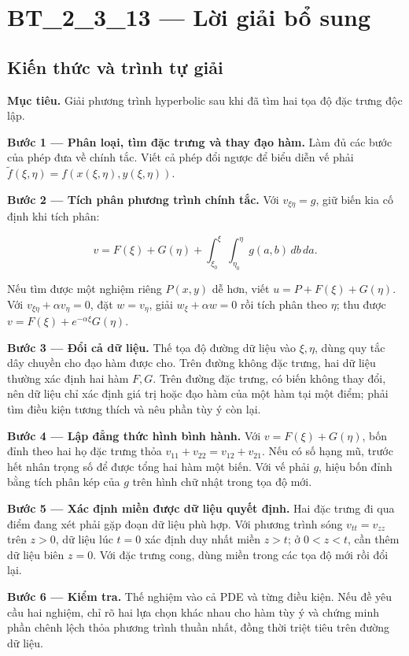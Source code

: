 \documentclass[10pt,a4paper]{article}
\begin{document}
\section*{BT\_2\_3\_13 — Lời giải bổ sung}
\subsection*{Kiến thức và trình tự giải}
\textbf{Mục tiêu.} Giải phương trình hyperbolic sau khi đã tìm hai tọa độ đặc trưng độc lập.

\textbf{Bước 1 — Phân loại, tìm đặc trưng và thay đạo hàm.} Làm đủ các bước của phép đưa về chính tắc. Viết cả phép đổi ngược để biểu diễn vế phải $\widetilde f(\xi,\eta)=f(x(\xi,\eta),y(\xi,\eta))$.

\textbf{Bước 2 — Tích phân phương trình chính tắc.} Với $v_{\xi\eta}=g$, giữ biến kia cố định khi tích phân:


\[
v=F(\xi)+G(\eta)+\int_{\xi_0}^{\xi}\int_{\eta_0}^{\eta}g(a,b)\,db\,da.
\]


Nếu tìm được một nghiệm riêng $P(x,y)$ dễ hơn, viết $u=P+F(\xi)+G(\eta)$. Với $v_{\xi\eta}+\alpha v_\eta=0$, đặt $w=v_\eta$, giải $w_\xi+\alpha w=0$ rồi tích phân theo $\eta$; thu được $v=F(\xi)+e^{-\alpha\xi}G(\eta)$.

\textbf{Bước 3 — Đổi cả dữ liệu.} Thế tọa độ đường dữ liệu vào $\xi,\eta$, dùng quy tắc dây chuyền cho đạo hàm được cho. Trên đường không đặc trưng, hai dữ liệu thường xác định hai hàm $F,G$. Trên đường đặc trưng, có biến không thay đổi, nên dữ liệu chỉ xác định giá trị hoặc đạo hàm của một hàm tại một điểm; phải tìm điều kiện tương thích và nêu phần tùy ý còn lại.

\textbf{Bước 4 — Lập đẳng thức hình bình hành.} Với $v=F(\xi)+G(\eta)$, bốn đỉnh theo hai họ đặc trưng thỏa $v_{11}+v_{22}=v_{12}+v_{21}$. Nếu có số hạng mũ, trước hết nhân trọng số để được tổng hai hàm một biến. Với vế phải $g$, hiệu bốn đỉnh bằng tích phân kép của $g$ trên hình chữ nhật trong tọa độ mới.

\textbf{Bước 5 — Xác định miền được dữ liệu quyết định.} Hai đặc trưng đi qua điểm đang xét phải gặp đoạn dữ liệu phù hợp. Với phương trình sóng $v_{tt}=v_{zz}$ trên $z>0$, dữ liệu lúc $t=0$ xác định duy nhất miền $z>t$; ở $0<z<t$, cần thêm dữ liệu biên $z=0$. Với đặc trưng cong, dùng miền trong các tọa độ mới rồi đổi lại.

\textbf{Bước 6 — Kiểm tra.} Thế nghiệm vào cả PDE và từng điều kiện. Nếu đề yêu cầu hai nghiệm, chỉ rõ hai lựa chọn khác nhau cho hàm tùy ý và chứng minh phần chênh lệch thỏa phương trình thuần nhất, đồng thời triệt tiêu trên đường dữ liệu.
\end{document}
